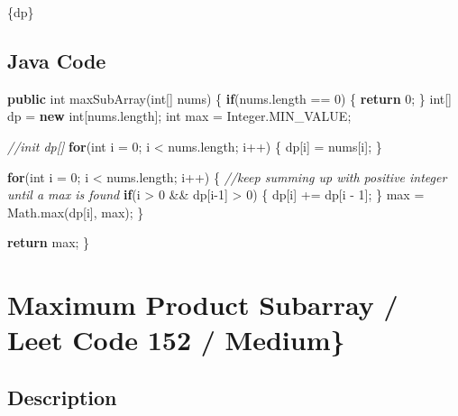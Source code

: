 \documentclass[]{book}
\newenvironment{Shaded}{\begin{snugshade}}{\end{snugshade}}
\newcommand{\BuiltInTok}[1]{#1}
\newcommand{\CommentTok}[1]{\textcolor[rgb]{0.56,0.35,0.01}{\textit{#1}}}
\newcommand{\DataTypeTok}[1]{\textcolor[rgb]{0.13,0.29,0.53}{#1}}
\newcommand{\DecValTok}[1]{\textcolor[rgb]{0.00,0.00,0.81}{#1}}
\newcommand{\FunctionTok}[1]{\textcolor[rgb]{0.00,0.00,0.00}{#1}}
\newcommand{\KeywordTok}[1]{\textcolor[rgb]{0.13,0.29,0.53}{\textbf{#1}}}
\newcommand{\NormalTok}[1]{#1}
\begin{document}
\{dp\}

\hypertarget{java-code-22}{%
\subsection{Java Code}\label{java-code-22}}

\begin{Shaded}
\begin{Highlighting}[]
\KeywordTok{public} \DataTypeTok{int} \FunctionTok{maxSubArray}\NormalTok{(}\DataTypeTok{int}\NormalTok{[] nums) \{}
    \KeywordTok{if}\NormalTok{(nums.}\FunctionTok{length}\NormalTok{ == }\DecValTok{0}\NormalTok{) \{}
        \KeywordTok{return} \DecValTok{0}\NormalTok{;}
\NormalTok{    \}}
    \DataTypeTok{int}\NormalTok{[] dp = }\KeywordTok{new} \DataTypeTok{int}\NormalTok{[nums.}\FunctionTok{length}\NormalTok{];}
    \DataTypeTok{int}\NormalTok{ max = }\BuiltInTok{Integer}\NormalTok{.}\FunctionTok{MIN_VALUE}\NormalTok{;}

    \CommentTok{//init dp[]}
    \KeywordTok{for}\NormalTok{(}\DataTypeTok{int}\NormalTok{ i = }\DecValTok{0}\NormalTok{; i < nums.}\FunctionTok{length}\NormalTok{; i++) \{}
\NormalTok{        dp[i] = nums[i];}
\NormalTok{    \}}

    \KeywordTok{for}\NormalTok{(}\DataTypeTok{int}\NormalTok{ i = }\DecValTok{0}\NormalTok{; i < nums.}\FunctionTok{length}\NormalTok{; i++) \{}
        \CommentTok{//keep summing up with positive integer until a max is found}
        \KeywordTok{if}\NormalTok{(i > }\DecValTok{0}\NormalTok{ && dp[i}\DecValTok{-1}\NormalTok{] > }\DecValTok{0}\NormalTok{) \{}
\NormalTok{            dp[i] += dp[i - }\DecValTok{1}\NormalTok{];}
\NormalTok{        \}}
\NormalTok{        max = }\BuiltInTok{Math}\NormalTok{.}\FunctionTok{max}\NormalTok{(dp[i], max);}
\NormalTok{    \}}

    \KeywordTok{return}\NormalTok{ max;}
\NormalTok{\}}
\end{Highlighting}
\end{Shaded}

\hypertarget{maximum-product-subarray-leet-code-152-medium}{%
\section{Maximum Product Subarray / Leet Code 152 / Medium\}}\label{maximum-product-subarray-leet-code-152-medium}}

\hypertarget{description-26}{%
\subsection{Description}\label{description-26}}
\end{document}

